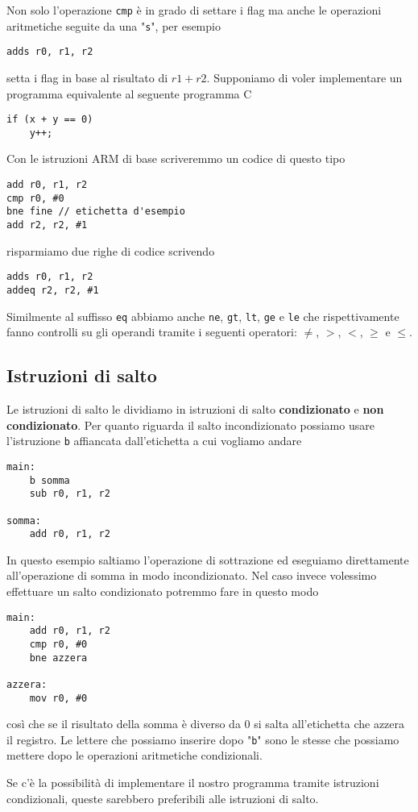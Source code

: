 Non solo l'operazione \verb|cmp| è in grado di settare i flag ma anche le operazioni aritmetiche
seguite da una "\verb|s|", per esempio
\begin{verbatim}
adds r0, r1, r2
\end{verbatim}
setta i flag in base al risultato di $r1 + r2$. Supponiamo di voler implementare un programma
equivalente al seguente programma C
\begin{verbatim}
if (x + y == 0)
	y++;
\end{verbatim}
Con le istruzioni ARM di base scriveremmo un codice di questo tipo
\begin{verbatim}
add r0, r1, r2
cmp r0, #0
bne fine // etichetta d'esempio
add r2, r2, #1
\end{verbatim}
risparmiamo due righe di codice scrivendo
\begin{verbatim}
adds r0, r1, r2
addeq r2, r2, #1
\end{verbatim}
Similmente al suffisso \verb|eq| abbiamo anche \verb|ne|, \verb|gt|, \verb|lt|, \verb|ge| e
\verb|le| che rispettivamente fanno controlli su gli operandi tramite i seguenti operatori:
$\neq$, $>$, $<$, $\geq$ e $\leq$.

\subsection{Istruzioni di salto}
Le istruzioni di salto le dividiamo in istruzioni di salto \textbf{condizionato} e
\textbf{non condizionato}. Per quanto riguarda il salto incondizionato possiamo usare l'istruzione
\verb|b| affiancata dall'etichetta a cui vogliamo andare
\begin{verbatim}
main:
	b somma
	sub r0, r1, r2

somma:
	add r0, r1, r2
\end{verbatim}
In questo esempio saltiamo l'operazione di sottrazione ed eseguiamo direttamente all'operazione di
somma in modo incondizionato. Nel caso invece volessimo effettuare un salto condizionato potremmo
fare in questo modo
\begin{verbatim}
main:
	add r0, r1, r2
	cmp r0, #0
	bne azzera

azzera:
	mov r0, #0
\end{verbatim}
così che se il risultato della somma è diverso da 0 si salta all'etichetta che azzera il registro.
Le lettere che possiamo inserire dopo "\verb|b|" sono le stesse che possiamo mettere dopo le
operazioni aritmetiche condizionali.

Se c'è la possibilità di implementare il nostro programma tramite istruzioni condizionali, queste
sarebbero preferibili alle istruzioni di salto.

